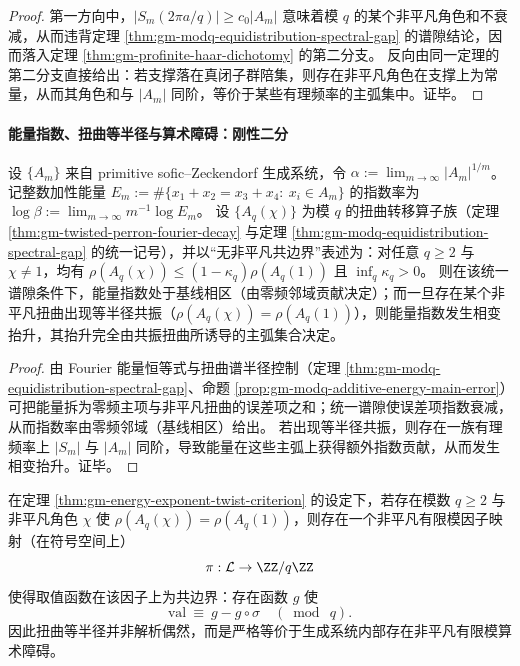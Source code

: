\begin{proof}
第一方向中，\(|S_m(2\pi a/q)|\ge c_0|A_m|\) 意味着模 \(q\) 的某个非平凡角色和不衰减，从而违背定理 \ref{thm:gm-modq-equidistribution-spectral-gap} 的谱隙结论，因而落入定理 \ref{thm:gm-profinite-haar-dichotomy} 的第二分支。
反向由同一定理的第二分支直接给出：若支撑落在真闭子群陪集，则存在非平凡角色在支撑上为常量，从而其角色和与 \(|A_m|\) 同阶，等价于某些有理频率的主弧集中。证毕。
\end{proof}

\paragraph{能量指数、扭曲等半径与算术障碍：刚性二分}
\begin{theorem}\label{thm:gm-energy-exponent-twist-criterion}
设 \(\{A_m\}\) 来自 primitive sofic--Zeckendorf 生成系统，令 \(\alpha:=\lim_{m\to\infty}|A_m|^{1/m}\)。
记整数加性能量
\(
E_m:=\#\{x_1+x_2=x_3+x_4:\ x_i\in A_m\}
\)
的指数率为 \(\log\beta:=\lim_{m\to\infty}m^{-1}\log E_m\)。
设 \(\{A_q(\chi)\}\) 为模 \(q\) 的扭曲转移算子族（定理 \ref{thm:gm-twisted-perron-fourier-decay} 与定理 \ref{thm:gm-modq-equidistribution-spectral-gap} 的统一记号），并以“无非平凡共边界”表述为：对任意 \(q\ge 2\) 与 \(\chi\ne 1\)，均有 \(\rho(A_q(\chi))\le (1-\kappa_q)\rho(A_q(1))\) 且 \(\inf_q\kappa_q>0\)。
则在该统一谱隙条件下，能量指数处于基线相区（由零频邻域贡献决定）；而一旦存在某个非平凡扭曲出现等半径共振（\(\rho(A_q(\chi))=\rho(A_q(1))\)），则能量指数发生相变抬升，其抬升完全由共振扭曲所诱导的主弧集合决定。
\end{theorem}

\begin{proof}
由 Fourier 能量恒等式与扭曲谱半径控制（定理 \ref{thm:gm-modq-equidistribution-spectral-gap}、命题 \ref{prop:gm-modq-additive-energy-main-error}）可把能量拆为零频主项与非平凡扭曲的误差项之和；统一谱隙使误差项指数衰减，从而指数率由零频邻域（基线相区）给出。
若出现等半径共振，则存在一族有理频率上 \(|S_m|\) 与 \(|A_m|\) 同阶，导致能量在这些主弧上获得额外指数贡献，从而发生相变抬升。证毕。
\end{proof}

\begin{theorem}\label{thm:gm-twist-equal-radius-arithmetic-factor}
在定理 \ref{thm:gm-energy-exponent-twist-criterion} 的设定下，若存在模数 \(q\ge 2\) 与非平凡角色 \(\chi\) 使 \(\rho(A_q(\chi))=\rho(A_q(1))\)，则存在一个非平凡有限模因子映射（在符号空间上）
\[
\pi:\mathcal{L}\to\ZZ/q\ZZ
\]
使得取值函数在该因子上为共边界：存在函数 \(g\) 使
\[
\mathrm{val}\ \equiv\ g-g\circ\sigma\quad (\bmod\ q).
\]
因此扭曲等半径并非解析偶然，而是严格等价于生成系统内部存在非平凡有限模算术障碍。
\end{theorem}

